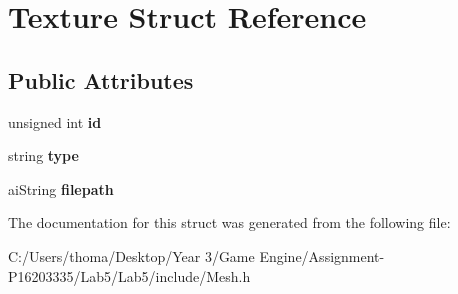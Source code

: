 \hypertarget{struct_texture}{}\section{Texture Struct Reference}
\label{struct_texture}
\subsection*{Public Attributes}
\begin{DoxyCompactItemize}
\item 
\mbox{\label{struct_texture_aed42161a5c00b6020c85833401da6da6}} 
unsigned int {\bfseries id}
\item 
\mbox{\label{struct_texture_adacb495ed5140ec76a09cd130e7d5c32}} 
string {\bfseries type}
\item 
\mbox{\label{struct_texture_a69c8def64c608063b2ecb7fd785121ee}} 
ai\+String {\bfseries filepath}
\end{DoxyCompactItemize}


The documentation for this struct was generated from the following file\+:\begin{DoxyCompactItemize}
\item 
C\+:/\+Users/thoma/\+Desktop/\+Year 3/\+Game Engine/\+Assignment-\/\+P16203335/\+Lab5/\+Lab5/include/Mesh.\+h\end{DoxyCompactItemize}
